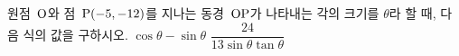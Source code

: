 원점~$\mathrm{O}$와 점~$\mathrm{P}(-5{,}\mkern3mu\mathopen{}-12)$를 지나는 동경~$\mathrm{OP}$가 나타내는 각의 크기를 $\theta$라 할 때, 다음 식의 값을 구하시오.
 $\cos\theta-\sin\theta$
 $\dfrac{24}{13\sin\theta\tan\theta}$
